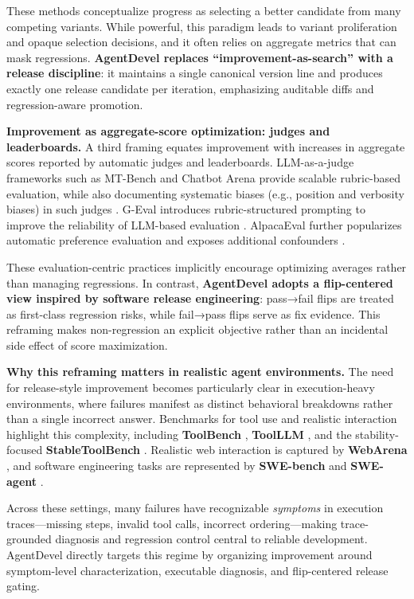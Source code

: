 \documentclass[11pt]{article}
\begin{document}
These methods conceptualize progress as selecting a better candidate from many competing variants. While powerful, this paradigm leads to variant proliferation and opaque selection decisions, and it often relies on aggregate metrics that can mask regressions. \textbf{AgentDevel replaces “improvement-as-search” with a release discipline}: it maintains a single canonical version line and produces exactly one release candidate per iteration, emphasizing auditable diffs and regression-aware promotion.

\textbf{Improvement as aggregate-score optimization: judges and leaderboards.} A third framing equates improvement with increases in aggregate scores reported by automatic judges and leaderboards. LLM-as-a-judge frameworks such as MT-Bench and Chatbot Arena provide scalable rubric-based evaluation, while also documenting systematic biases (e.g., position and verbosity biases) in such judges \cite{zheng2023judging}. G-Eval introduces rubric-structured prompting to improve the reliability of LLM-based evaluation \cite{liu-etal-2023-g}. AlpacaEval further popularizes automatic preference evaluation and exposes additional confounders \cite{tatsulab2023alpacaeval,dubois2024lengthcontrolledalpacaeval}.

These evaluation-centric practices implicitly encourage optimizing averages rather than managing regressions. In contrast, \textbf{AgentDevel adopts a flip-centered view inspired by software release engineering}: pass→fail flips are treated as first-class regression risks, while fail→pass flips serve as fix evidence. This reframing makes non-regression an explicit objective rather than an incidental side effect of score maximization.

\textbf{Why this reframing matters in realistic agent environments.} The need for release-style improvement becomes particularly clear in execution-heavy environments, where failures manifest as distinct behavioral breakdowns rather than a single incorrect answer. Benchmarks for tool use and realistic interaction highlight this complexity, including \textbf{ToolBench} \cite{xu2023toolbench}, \textbf{ToolLLM} \cite{qin2023toollm}, and the stability-focused \textbf{StableToolBench} \cite{guo-etal-2024-stabletoolbench}. Realistic web interaction is captured by \textbf{WebArena} \cite{zhou2023webarena}, and software engineering tasks are represented by \textbf{SWE-bench} \cite{jimenez2023swebench} and \textbf{SWE-agent} \cite{yang2024sweagent}.

Across these settings, many failures have recognizable \textit{symptoms} in execution traces—missing steps, invalid tool calls, incorrect ordering—making trace-grounded diagnosis and regression control central to reliable development. AgentDevel directly targets this regime by organizing improvement around symptom-level characterization, executable diagnosis, and flip-centered release gating.
\end{document}
